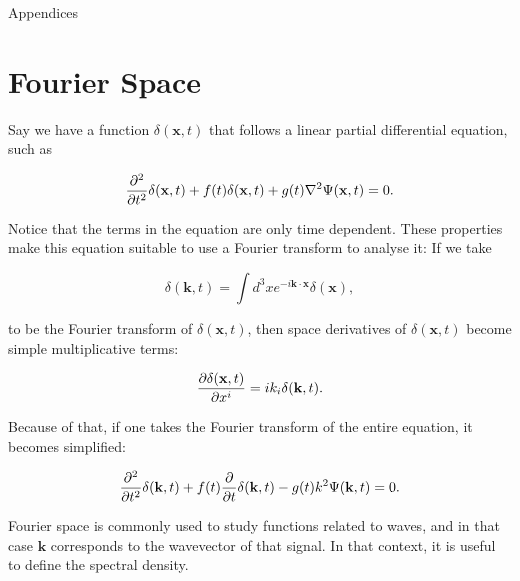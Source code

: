 \documentclass[openany,a4paper,12pt,oneside]{book}
\begin{document}
\begin{spacing}{1.5}
\appendix

\newpage

\begin{center}
\thispagestyle{empty}
\vspace*{\fill}
\Huge{Appendices}
\vspace*{\fill}
\end{center}

\iffalse %
\chapter{Fourier Space}\label{appendix:FourierSpace}

Say we have a function $\delta(\mathbf{x},t)$ that follows a linear partial differential equation, such as

\begin{equation}\label{Four_Space:example_diff_eq}
	\pdv[2]{}{t} \delta(\mathbf{x},t) +f(t)\delta(\mathbf{x},t) + g(t)\nabla^2\Psi(\mathbf{x},t)=0.
\end{equation}

Notice that the terms in the equation are only time dependent. These properties make this equation suitable to use a Fourier transform to analyse it: If we take

\begin{equation}
	\delta(\mathbf{k},t)=\int d^3x e^{-i\mathbf{k}\cdot \mathbf{x}}\delta(\mathbf{x}),
\end{equation}

\noindent to be the Fourier transform of $\delta(\mathbf{x},t)$, then space derivatives of $\delta(\mathbf{x},t)$ become simple multiplicative terms:

\begin{equation}
	\pdv{\delta(\mathbf{x},t)}{x^i}=ik_i\delta(\mathbf{k},t).
\end{equation}

Because of that, if one takes the Fourier transform of the entire equation, it becomes simplified:

\begin{equation}\label{Four_Space:final_eq}
	\pdv[2]{}{t}\delta(\mathbf{k},t)+f(t)\pdv{}{t}\delta(\mathbf{k},t)-g(t)k^2\Psi(\mathbf{k},t)=0.
\end{equation}

Fourier space is commonly used to study functions related to waves, and in that case $\mathbf{k}$ corresponds to the wavevector of that signal. In that context, it is useful to define the spectral density.


\end{spacing}
\end{document}
